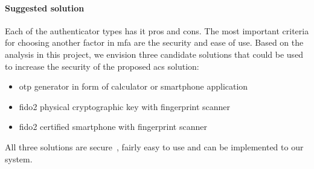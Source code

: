 \paragraph{Suggested solution}
Each of the authenticator types has it pros and cons. The most important criteria for choosing another factor in \acrshort{mfa} are the security and ease of use. Based on the analysis in this project, we envision three candidate solutions that could be used to increase the security of the proposed \acrshort{acs} solution:
\begin{itemize}[noitemsep]
    \item \acrshort{otp} generator in form of calculator or smartphone application
    \item \acrshort{fido}2 physical cryptographic key with fingerprint scanner
    \item \acrshort{fido}2 certified smartphone with fingerprint scanner
\end{itemize}
All three solutions are secure~\cite{Grassi2017DigitalManagement, FIDOFIDO2Project}, fairly easy to use and can be implemented to our system.